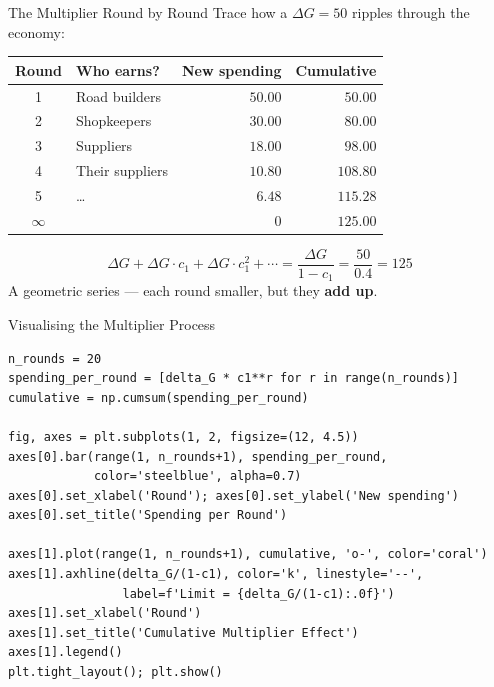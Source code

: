 \documentclass[aspectratio=169, 10pt]{beamer}
\begin{document}
\begin{frame}{The Multiplier Round by Round}
Trace how a $\Delta G = 50$ ripples through the economy:
\vspace{0.3em}
\begin{center}
\begin{tabular}{clr@{\qquad}r}
\toprule
\textbf{Round} & \textbf{Who earns?} & \textbf{New spending} & \textbf{Cumulative} \\
\midrule
1 & Road builders     & $50.00$  & $50.00$ \\
2 & Shopkeepers       & $30.00$  & $80.00$ \\
3 & Suppliers         & $18.00$  & $98.00$ \\
4 & Their suppliers   & $10.80$  & $108.80$ \\
5 & \ldots            & $\;6.48$ & $115.28$ \\
\midrule
$\infty$ & & $0$ & $\mathbf{125.00}$ \\
\bottomrule
\end{tabular}
\end{center}
\vspace{0.3em}
\[
  \Delta G + \Delta G \cdot c_1 + \Delta G \cdot c_1^2 + \cdots
  = \frac{\Delta G}{1 - c_1} = \frac{50}{0.4} = 125
\]
A geometric series --- each round smaller, but they \textbf{add up}.
\end{frame}

\begin{frame}[fragile]{Visualising the Multiplier Process}
\begin{lstlisting}
n_rounds = 20
spending_per_round = [delta_G * c1**r for r in range(n_rounds)]
cumulative = np.cumsum(spending_per_round)

fig, axes = plt.subplots(1, 2, figsize=(12, 4.5))
axes[0].bar(range(1, n_rounds+1), spending_per_round,
            color='steelblue', alpha=0.7)
axes[0].set_xlabel('Round'); axes[0].set_ylabel('New spending')
axes[0].set_title('Spending per Round')

axes[1].plot(range(1, n_rounds+1), cumulative, 'o-', color='coral')
axes[1].axhline(delta_G/(1-c1), color='k', linestyle='--',
                label=f'Limit = {delta_G/(1-c1):.0f}')
axes[1].set_xlabel('Round')
axes[1].set_title('Cumulative Multiplier Effect')
axes[1].legend()
plt.tight_layout(); plt.show()
\end{lstlisting}
\end{frame}
\end{document}
